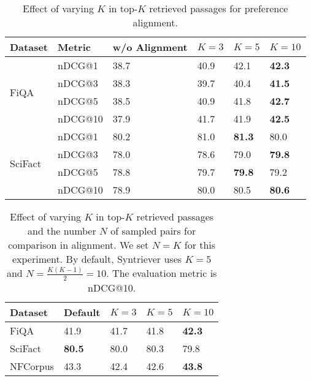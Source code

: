 \begin{table}[t!]
\begin{adjustbox}{width=.5\textwidth,center}
\begin{tabular}{l|l|l|l|l|l}
\hline
\textbf{Dataset}          & \textbf{Metric}  &  
\textbf{w/o Alignment} &  $K=3$ & $K=5$ & $K=10$ \\ \hline
\multirow{4}{*}{FiQA}     & nDCG@1  &    38.7   &  
    40.9    &       42.1         &    \textbf{42.3}     \\  
                          & nDCG@3  &    38.3   &     39.7          &     40.4           &            \textbf{41.5}     \\ 
                          & nDCG@5  &    38.5   &      40.9         &             41.8   &           \textbf{42.7}      \\  
                          & nDCG@10 &    37.9   &     41.7          &             41.9   &           \textbf{42.5}      \\ \hline
\multirow{4}{*}{SciFact}     & nDCG@1  &    80.2   &      81.0         &         \textbf{81.3}       &         80.0        \\  
                          & nDCG@3  &    78.0   &     78.6          &        79.0        &        \textbf{79.8}         \\ 
                          & nDCG@5  &   78.8    &     79.7          &        \textbf{79.8}        &         79.2        \\  
                          & nDCG@10 &   78.9    &     80.0          &       80.5         &        \textbf{80.6}         \\ \hline
\end{tabular}
\end{adjustbox}
\caption{Effect of varying $K$ in  top-$K$ retrieved passages for preference alignment.}
\label{tab:ablation_topk}
\end{table}

\begin{table}[t!]
\begin{adjustbox}{width=.5\textwidth,center}
\begin{tabular}{l|l|l|l|l}
\hline
\textbf{Dataset} & Default &  $K=3$ & $K=5$ & $K=10$ \\ \hline
FiQA & 41.9 & 41.7 & 41.8 & \textbf{42.3} \\
SciFact & \textbf{80.5} & 80.0 & 80.3 & 79.8 \\
NFCorpus & 43.3 & 42.4 & 42.6 & \textbf{43.8} \\\hline
\end{tabular}
\end{adjustbox}
\caption{Effect of varying $K$ in  top-$K$ retrieved passages and the number $N$ of sampled pairs for comparison in alignment.  We set $N=K$ for this experiment. By default, Syntriever uses $K=5$ and $N=\frac{K(K-1)}{2}=10$.  The evaluation metric is nDCG@10.}
\label{tab:ablation_k_n}
\end{table}

